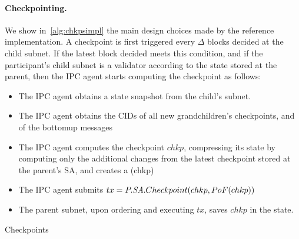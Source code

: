 \paragraph{Checkpointing.} We show in~\cref{alg:chkpsimpl} the main design choices made by the reference implementation. A checkpoint is first triggered every $\Delta$ blocks decided at the child subnet. If the latest block decided meets this condition, and if the participant's child subnet is a validator according to the state stored at the parent, then the IPC agent starts computing the checkpoint as follows:
\begin{itemize}
    \item The IPC agent obtains a state snapshot from the child's subnet.
    \item The IPC agent obtains the CIDs of all new grandchildren's checkpoints, and of the bottomup \postoffice messages
    \item The IPC agent computes the checkpoint $chkp$, compressing its state by computing only the additional changes from the latest checkpoint stored at the parent's SA, and creates a \pof(chkp)
    \item The IPC agent submits $tx=P.\textit{SA}.Checkpoint(chkp, PoF(chkp))$
    \item The parent subnet, upon ordering and executing $tx$, saves $chkp$ in the state.  
\end{itemize}

\begin{algorithm}[H]
\footnotesize
\caption{Checkpoints \impl}\label{alg:chkpsimpl} 
  \DontPrintSemicolon
  
  
\end{algorithm}

